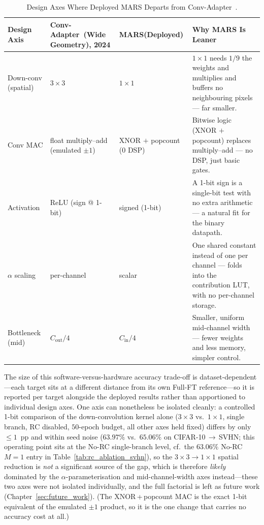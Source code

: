 \documentclass[12pt, a4paper]{report}
\numberwithin{equation}{chapter}
\numberwithin{figure}{chapter}
\numberwithin{table}{chapter}
\numberwithin{algorithm}{chapter}
\begin{document}
\begin{table}[H]
\centering
\caption{Design Axes Where Deployed MARS Departs from Conv-Adapter~\cite{Chen2024ConvAdapter}.}
\label{tab:hw_design_choices}
\renewcommand{\arraystretch}{1.5}
\begin{tabular}{p{2.2cm}p{3.6cm}p{3.2cm}p{5.0cm}}
\toprule
\textbf{Design Axis} & {\raggedright\textbf{Conv-Adapter~\cite{Chen2024ConvAdapter}}\newline\textbf{(Wide Geometry), 2024}\par} & {\raggedright\textbf{MARS}\newline\textbf{(Deployed)}\par} & \textbf{Why MARS Is Leaner} \\
\midrule
Down-conv (spatial) & $3\times 3$ & $1\times 1$ & $1\times 1$ needs $1/9$ the weights and multiplies and buffers no neighbouring pixels --- far smaller. \\
\midrule
Conv MAC & float multiply--add (emulated $\pm 1$) & XNOR $+$ popcount (0 DSP) & Bitwise logic (XNOR $+$ popcount) replaces multiply--add --- no DSP, just basic gates. \\
\midrule
Activation & ReLU (sign @ 1-bit) & signed (1-bit) & A 1-bit sign is a single-bit test with no extra arithmetic --- a natural fit for the binary datapath. \\
\midrule
$\alpha$ scaling & per-channel & scalar & One shared constant instead of one per channel --- folds into the contribution LUT, with no per-channel storage. \\
\midrule
Bottleneck (mid) & $C_{\text{out}}/4$ & $C_{\text{in}}/4$ & Smaller, uniform mid-channel width --- fewer weights and less memory, simpler control. \\
\bottomrule
\end{tabular}
\end{table}

The size of this software-versus-hardware accuracy trade-off is dataset-dependent---each target sits at a different distance from its own Full-FT reference---so it is reported per target alongside the deployed results rather than apportioned to individual design axes. One axis can nonetheless be isolated cleanly: a controlled 1-bit comparison of the down-convolution kernel alone ($3\times 3$ vs.\ $1\times 1$, single branch, RC disabled, $50$-epoch budget, all other axes held fixed) differs by only $\leq 1$~pp and within seed noise ($63.97\%$ vs.\ $65.06\%$ on CIFAR-10\,$\to$\,SVHN; this operating point sits at the No-RC single-branch level, cf.\ the $63.06\%$ No-RC $M{=}1$ entry in Table~\ref{tab:rc_ablation_svhn}), so the $3\times 3\!\to\!1\times 1$ spatial reduction is \emph{not} a significant source of the gap, which is therefore \emph{likely} dominated by the $\alpha$-parameterisation and mid-channel-width axes instead---these two axes were not isolated individually, and the full factorial is left as future work (Chapter~\ref{sec:future_work}). (The XNOR\,+\,popcount MAC is the exact 1-bit equivalent of the emulated $\pm 1$ product, so it is the one change that carries no accuracy cost at all.)
\end{document}
